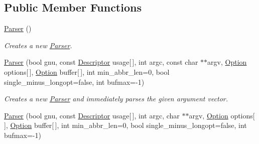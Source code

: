 \subsection*{Public Member Functions}
\begin{DoxyCompactItemize}
\item 
\hypertarget{classxmem_1_1config_1_1third__party_1_1_parser_ad88ba9ed583f79c279e84e823ab3864f}{\hyperlink{classxmem_1_1config_1_1third__party_1_1_parser_ad88ba9ed583f79c279e84e823ab3864f}{Parser} ()}\label{classxmem_1_1config_1_1third__party_1_1_parser_ad88ba9ed583f79c279e84e823ab3864f}

\begin{DoxyCompactList}\small\item\em Creates a new \hyperlink{classxmem_1_1config_1_1third__party_1_1_parser}{Parser}. \end{DoxyCompactList}\item 
\hyperlink{classxmem_1_1config_1_1third__party_1_1_parser_ab6131802b5bacfb921963abd183b5c85}{Parser} (bool gnu, const \hyperlink{structxmem_1_1config_1_1third__party_1_1_descriptor}{Descriptor} usage\mbox{[}$\,$\mbox{]}, int argc, const char $\ast$$\ast$argv, \hyperlink{classxmem_1_1config_1_1third__party_1_1_option}{Option} options\mbox{[}$\,$\mbox{]}, \hyperlink{classxmem_1_1config_1_1third__party_1_1_option}{Option} buffer\mbox{[}$\,$\mbox{]}, int min\-\_\-abbr\-\_\-len=0, bool single\-\_\-minus\-\_\-longopt=false, int bufmax=-\/1)
\begin{DoxyCompactList}\small\item\em Creates a new \hyperlink{classxmem_1_1config_1_1third__party_1_1_parser}{Parser} and immediately parses the given argument vector. \end{DoxyCompactList}\item 
\hypertarget{classxmem_1_1config_1_1third__party_1_1_parser_ae9669add72032bffff977e904b69f70a}{\hyperlink{classxmem_1_1config_1_1third__party_1_1_parser_ae9669add72032bffff977e904b69f70a}{Parser} (bool gnu, const \hyperlink{structxmem_1_1config_1_1third__party_1_1_descriptor}{Descriptor} usage\mbox{[}$\,$\mbox{]}, int argc, char $\ast$$\ast$argv, \hyperlink{classxmem_1_1config_1_1third__party_1_1_option}{Option} options\mbox{[}$\,$\mbox{]}, \hyperlink{classxmem_1_1config_1_1third__party_1_1_option}{Option} buffer\mbox{[}$\,$\mbox{]}, int min\-\_\-abbr\-\_\-len=0, bool single\-\_\-minus\-\_\-longopt=false, int bufmax=-\/1)}\label{classxmem_1_1config_1_1third__party_1_1_parser_ae9669add72032bffff977e904b69f70a}


\end{DoxyCompactItemize}
